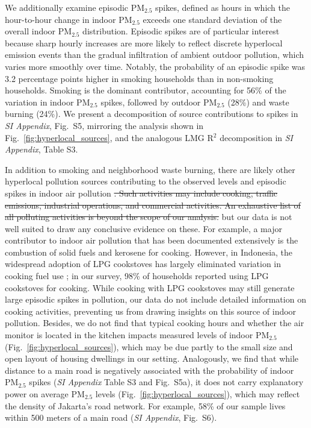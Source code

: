 \documentclass[reqno,12pt,notitlepage]{article}
\providecommand{\DIFadd}[1]{{\protect\color{BLUE}#1}} %
\providecommand{\DIFdel}[1]{{\protect\color{red}\sout{#1}}} %
\providecommand{\DIFaddbegin}{} %
\providecommand{\DIFaddend}{} %
\providecommand{\DIFdelbegin}{} %
\providecommand{\DIFdelend}{} %
\begin{document}
\DIFadd{We additionally examine episodic PM$_{2.5}$ spikes, defined as hours in which the hour-to-hour change in indoor PM$_{2.5}$ exceeds one standard deviation of the overall indoor PM$_{2.5}$ distribution. Episodic spikes are of particular interest because sharp hourly increases are more likely to reflect discrete hyperlocal emission events than the gradual infiltration of ambient outdoor pollution, which varies more smoothly over time. Notably, the probability of an episodic spike was 3.2 percentage points higher in smoking households than in non-smoking households. Smoking is the dominant contributor, accounting for 56\% of the variation in indoor PM$_{2.5}$ spikes, followed by outdoor PM$_{2.5}$ (28\%) and waste burning (24\%). We present a decomposition of source contributions to spikes in \textit{SI Appendix}, Fig.\ S5, mirroring the analysis shown in Fig.\ \ref{fig:hyperlocal_sources}, and the analogous LMG R$^2$ decomposition in \textit{SI Appendix}, Table S3.
}

\DIFaddend In addition to smoking and neighborhood waste burning, there are likely other hyperlocal pollution sources contributing to the observed \DIFaddbegin \DIFadd{levels and episodic }\DIFaddend spikes in indoor air pollution \DIFdelbegin \DIFdel{. Such activities may include cooking, traffic emissions, industrial operations, and commercial activities. An exhaustive list of all polluting activities is beyond the scope of our analysis. }\DIFdelend \DIFaddbegin \DIFadd{but our data is not well suited to draw any conclusive evidence on these. For example, a major contributor to indoor air pollution that has been documented extensively is the combustion of solid fuels and kerosene for cooking. However, in Indonesia, the widespread adoption of LPG cookstoves has largely eliminated variation in cooking fuel use \citep{astuti_successful_2019}; in our survey, 98\% of households reported using LPG cookstoves for cooking. While cooking with LPG cookstoves may still generate large episodic spikes in pollution, our data do not include detailed information on cooking activities, preventing us from drawing insights on this source of indoor pollution. Besides, we do not find that typical cooking hours and whether the air monitor is located in the kitchen impacts measured levels of indoor PM$_{2.5}$ (Fig.\ \ref{fig:hyperlocal_sources}), which may be due partly to the small size and open layout of housing dwellings in our setting. 
Analogously, we find that while distance to a main road is negatively associated with the probability of indoor PM$_{2.5}$ spikes (\textit{SI Appendix} Table S3 and Fig.\ S5a), it does not carry explanatory power on average PM$_{2.5}$ levels (Fig.\ \ref{fig:hyperlocal_sources}), which may reflect the density of Jakarta's road network. For example, 58\% of our sample lives within 500 meters of a main road (\textit{SI Appendix}, Fig.\ S6).
}\DIFaddend 
\end{document}

